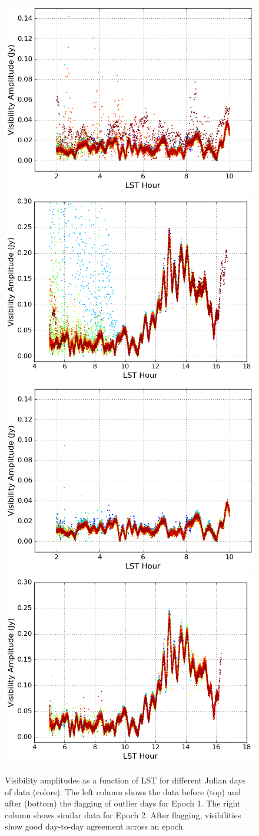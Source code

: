 \begin{figure}
	\centering
	\includegraphics[trim={0cm 0cm 0cm 0cm},clip,height=0.35\textwidth]{plots/psa128_meanVij_S1E1_before.png}
	\includegraphics[trim={0cm 0cm 0cm 0cm},clip,height=0.35\textwidth]{plots/psa128_meanVij_S1E2_before.png}
	\includegraphics[trim={0cm 0cm 0cm 0cm},clip,height=0.35\textwidth]{plots/psa128_meanVij_S1E1_after.png}
	\includegraphics[trim={0cm 0cm 0cm 0cm},clip,height=0.35\textwidth]{plots/psa128_meanVij_S1E2_after.png}
	\caption{Visibility amplitudes as a function of LST for different Julian days of data (colors). The left column shows the data before (top) and after (bottom) the flagging of outlier days for Epoch 1. The right column shows similar data for Epoch 2. After flagging, visibilities show good day-to-day agreement across an epoch.}
	\label{fig:psa128_meanVij}
\end{figure}

